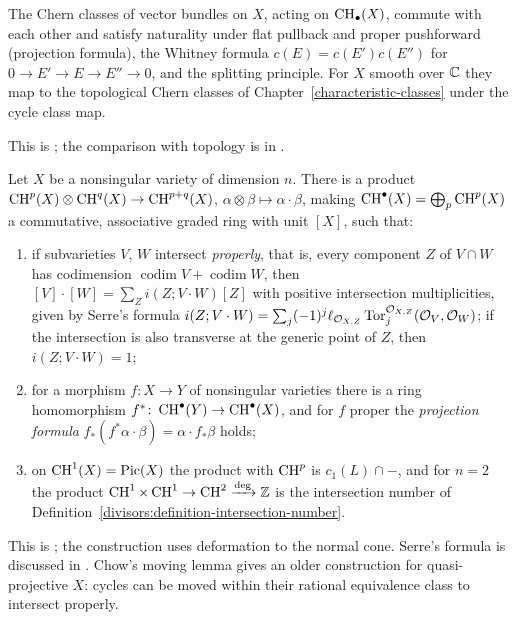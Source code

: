 \begin{theorem}\label{intersection-theory:theorem-chern-properties}
The Chern classes of vector bundles on $X$, acting on $\operatorname{CH}_\bullet(X)$, commute with each other and satisfy naturality under flat pullback and proper pushforward (projection formula),
the Whitney formula $c(E) = c(E')c(E'')$ for $0 \to E' \to E \to E'' \to 0$, and the splitting principle. For $X$ smooth over $\mathbb{C}$ they map to the topological Chern classes of
Chapter~\ref{characteristic-classes} under the cycle class map.
\end{theorem}

This is \cite[Theorem 3.2]{fulton-intersection}; the comparison with topology is in \cite[Chapter 19]{fulton-intersection}.

\begin{theorem}\label{intersection-theory:theorem-intersection-ring}
Let $X$ be a nonsingular variety of dimension $n$. There is a product $\operatorname{CH}^p(X) \otimes \operatorname{CH}^q(X) \to \operatorname{CH}^{p+q}(X)$, $\alpha \otimes \beta \mapsto \alpha \cdot \beta$, making
$\operatorname{CH}^\bullet(X) = \bigoplus_p\operatorname{CH}^p(X)$ a commutative, associative graded ring with unit $[X]$, such that:
\begin{enumerate}
\item if subvarieties $V$, $W$ intersect \emph{properly}, that is, every component $Z$ of $V \cap W$ has codimension $\operatorname{codim}V + \operatorname{codim}W$, then
$[V] \cdot [W] = \sum_Zi(Z; V \cdot W)[Z]$ with positive intersection multiplicities, given by Serre's formula
$i(Z; V \cdot W) = \sum_j(-1)^j\ell_{\mathcal{O}_{X,Z}}\operatorname{Tor}_j^{\mathcal{O}_{X,Z}}(\mathcal{O}_V, \mathcal{O}_W)$; if the intersection is also transverse at the generic point of $Z$, then $i(Z; V \cdot W) = 1$;
\item for a morphism $f \colon X \to Y$ of nonsingular varieties there is a ring homomorphism $f^* \colon \operatorname{CH}^\bullet(Y) \to \operatorname{CH}^\bullet(X)$, and for $f$ proper the
\emph{projection formula} $f_*(f^*\alpha \cdot \beta) = \alpha \cdot f_*\beta$ holds;
\item on $\operatorname{CH}^1(X) = \operatorname{Pic}(X)$ the product with $\operatorname{CH}^p$ is $c_1(L) \cap -$, and for $n = 2$ the product $\operatorname{CH}^1 \times \operatorname{CH}^1 \to \operatorname{CH}^2 \xrightarrow{\deg} \mathbb{Z}$ is the intersection
number of Definition~\ref{divisors:definition-intersection-number}.
\end{enumerate}
\end{theorem}

This is \cite[Chapters 6--8]{fulton-intersection}; the construction uses deformation to the normal cone. Serre's formula is discussed in \cite[Chapter 7]{fulton-intersection}.
Chow's moving lemma gives an older construction for quasi-projective $X$: cycles can be moved within their rational equivalence class to intersect properly.

